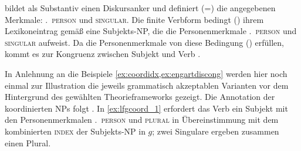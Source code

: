 bildet als Substantiv einen Diskursanker und definiert (=) die
angegebenen Merk\-male: \textsc{\Third.~person} und
\textsc{singular}. Die finite Verbform  bedingt (\req) ihrem
Lexikoneintrag gemäß eine Subjekts-NP, die die Personenmerkmale
\textsc{\Third.~person} und \textsc{singular} aufweist. Da die
Personenmerkmale von  diese Bedingung () erfüllen,
kommt es zur Kongruenz zwischen Subjekt und Verb
\autocite[vgl.][59]{bresnanetal2016}.

In Anlehnung an die Beispiele \cref{ex:coordidx,ex:engartdiscong} werden hier noch einmal zur Illustration die jeweils
grammatisch akzeptablen Varianten vor dem Hintergrund des gewählten
Theorieframeworks gezeigt. Die Annotation der koordinierten NPs folgt
\citet{peterson2004}. In \cref{ex:lfgcoord_1} erfordert das Verb 
ein Subjekt mit den Personenmerkmalen \textsc{\Third.~person} und
\textsc{plural} in Übereinstimmung mit dem kombinierten \textsc{index} der
Subjekts-NP in $g$; zwei Singulare ergeben zusammen einen Plural.

